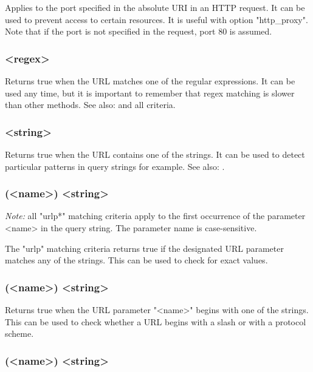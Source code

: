   Applies to the port specified in the absolute URI in an HTTP request. It can
  be used to prevent access to certain resources. It is useful with option
  "http\_proxy". Note that if the port is not specified in the request, port 80
  is assumed.

\subsubsection[url\_reg]{ <regex>}

  Returns true when the URL matches one of the regular expressions. It can be
  used any time, but it is important to remember that regex matching is slower
  than other methods.
See also:  and all  criteria.

\subsubsection[url\_sub]{ <string>}

  Returns true when the URL contains one of the strings. It can be used to
  detect particular patterns in query strings for example.
See also: .

\subsubsection[urlp]{(<name>) <string>}

  \emph{Note:} all "urlp*" matching criteria apply to the first occurrence of the
  parameter <name> in the query string. The parameter name is case-sensitive.

  The "urlp" matching criteria returns true if the designated URL parameter
  matches any of the strings. This can be used to check for exact values.

\subsubsection[urlp\_beg]{(<name>) <string>}

  Returns true when the URL parameter "<name>" begins with one of the strings.
  This can be used to check whether a URL begins with a slash or with a
  protocol scheme.

\subsubsection[urlp\_dir]{(<name>) <string>}

